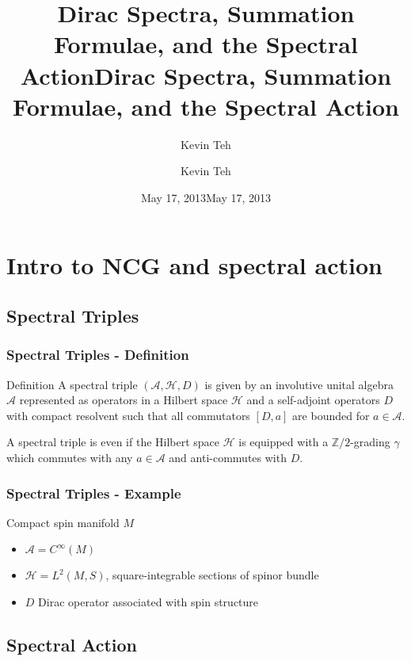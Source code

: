 \documentclass{beamer}
\title{Dirac Spectra, Summation Formulae, and the Spectral Action} \author{Kevin Teh} \date{May 17, 2013}
\title{Dirac Spectra, Summation Formulae, and the Spectral Action}
\author{Kevin Teh}
\institute{Caltech}
\date{May 17, 2013}
\def\Z{{\mathbb Z}}
\def\cA{{\mathcal A}}
\def\cH{{\mathcal H}}
\begin{document}
\begin{frame}
\titlepage
\end{frame}

\section{Intro to NCG and spectral action}

\subsection{Spectral Triples}
\begin{frame}
	\frametitle{Spectral Triples - Definition}
	\begin{block}{Definition}
		A spectral triple $(\cA, \cH, D)$ is given by an involutive unital algebra $\cA$ represented as operators in a Hilbert space $\cH$ and a self-adjoint operators $D$ with compact resolvent such that all commutators $[D, a]$ are bounded for $a \in \cA$.
	\end{block}
	\pause

	\begin{block}{}
		A spectral triple is even if the Hilbert space $\cH$ is equipped with a $\Z /2 $-grading $\gamma$ which commutes with any $a \in \cA$ and anti-commutes with $D$.
\end{block}
\end{frame}


\begin{frame}
	\frametitle{Spectral Triples - Example}
	\begin{exampleblock}{Compact spin manifold $M$}
		\begin{itemize}
			\item $\cA = C^{\infty}(M)$
			\item $\cH = L^2(M, S)$, square-integrable sections of spinor bundle
			\item $D$ Dirac operator associated with spin structure
		\end{itemize}
	\end{exampleblock}
\end{frame}

\subsection{Spectral Action}
\end{document}
